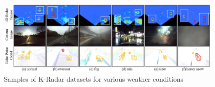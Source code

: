 \documentclass[rnd]{mas_proposal}
\begin{document}
\begin{itemize}
          \begin{figure}[h]
            \centering
            \includegraphics[width=1.0\textwidth]{images/all_sensors_in_adverse_weather.png}
            \caption{\centering Samples of K-Radar datasets for various weather conditions \cite{Paek2022Jun}}
            \label{fig:all_sensors_in_adverse_weather}
          \end{figure}





\end{itemize}
\end{document}
